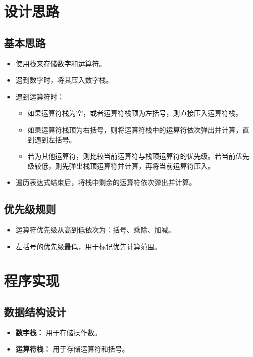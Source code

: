 \documentclass[UTF8]{ctexart}
\begin{document}
\pagestyle{fancy}
\fancyhead{}
\rhead{\today}

\section{设计思路}
\subsection{基本思路}
\begin{itemize}
    \item 使用栈来存储数字和运算符。
    \item 遇到数字时，将其压入数字栈。
    \item 遇到运算符时：
    \begin{itemize}
        \item 如果运算符栈为空，或者运算符栈顶为左括号，则直接压入运算符栈。
        \item 如果运算符栈顶为右括号，则将运算符栈中的运算符依次弹出并计算，直到遇到左括号。
        \item 若为其他运算符，则比较当前运算符与栈顶运算符的优先级。若当前优先级较低，则先弹出栈顶运算符并计算，再将当前运算符压入。
    \end{itemize}
    \item 遍历表达式结束后，将栈中剩余的运算符依次弹出并计算。
\end{itemize}

\subsection{优先级规则}
\begin{itemize}
    \item 运算符优先级从高到低依次为：括号、乘除、加减。
    \item 左括号的优先级最低，用于标记优先计算范围。
\end{itemize}

\section{程序实现}
\subsection{数据结构设计}
\begin{itemize}
    \item \textbf{数字栈：} 用于存储操作数。
    \item \textbf{运算符栈：} 用于存储运算符和括号。
\end{itemize}
\end{document}
